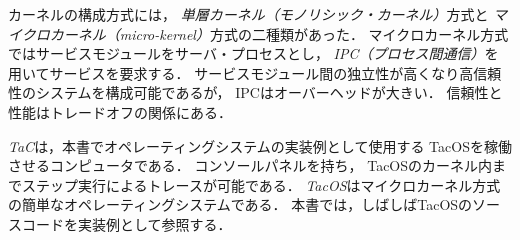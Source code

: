 カーネルの構成方式には，
\emph{単層カーネル（モノリシック・カーネル）}方式と
\emph{マイクロカーネル（micro-kernel）}方式の二種類があった．
マイクロカーネル方式ではサービスモジュールをサーバ・プロセスとし，
\emph{IPC（プロセス間通信）}を用いてサービスを要求する．
サービスモジュール間の独立性が高くなり高信頼性のシステムを構成可能であるが，
IPCはオーバーヘッドが大きい．
信頼性と性能はトレードオフの関係にある．

\emph{TaC}は，本書でオペレーティングシステムの実装例として使用する
TacOSを稼働させるコンピュータである．
コンソールパネルを持ち，
TacOSのカーネル内までステップ実行によるトレースが可能である．
\emph{TacOS}はマイクロカーネル方式の簡単なオペレーティングシステムである．
本書では，しばしばTacOSのソースコードを実装例として参照する．
